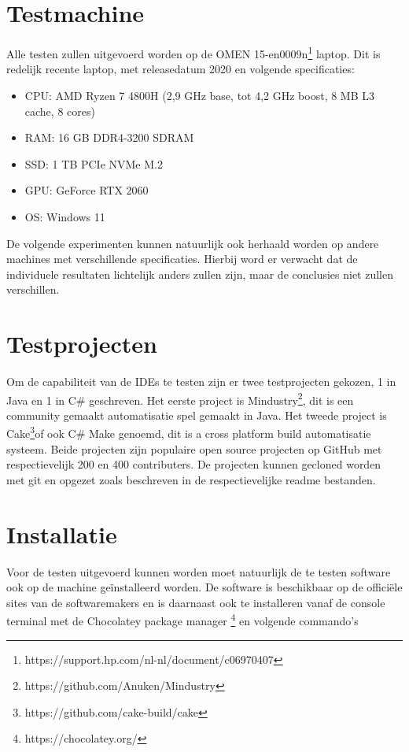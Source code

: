 \newpage

\section{Testmachine}
Alle testen zullen uitgevoerd worden op de OMEN 15-en0009n\footnote{https://support.hp.com/nl-nl/document/c06970407} laptop. Dit is redelijk recente laptop, met releasedatum 2020 en volgende specificaties:

\begin{itemize}
	\item 	CPU: AMD Ryzen 7 4800H (2,9 GHz base, tot 4,2 GHz boost, 8 MB L3 cache, 8 cores)
	\item RAM: 16 GB DDR4-3200 SDRAM
	\item SSD: 1 TB PCIe NVMe M.2
	\item GPU: GeForce RTX 2060
	\item OS: Windows 11
\end{itemize}

De volgende experimenten kunnen natuurlijk ook herhaald worden op andere machines met verschillende specificaties. Hierbij word er verwacht dat de individuele resultaten lichtelijk anders zullen zijn, maar de conclusies niet zullen verschillen.

\newcommand{\cakeRepoFN}{\footnote{https://github.com/cake-build/cake}}
\newcommand{\mindustryRepoFN}{\footnote{https://github.com/Anuken/Mindustry}}

\section{Testprojecten}
Om de capabiliteit van de IDEs te testen zijn er twee testprojecten gekozen, 1 in Java en 1 in C\# geschreven. Het eerste project is Mindustry\mindustryRepoFN, dit is een community gemaakt automatisatie spel gemaakt in Java. Het tweede project is Cake\cakeRepoFN of ook C\# Make genoemd, dit  is a cross platform build automatisatie systeem. Beide projecten zijn populaire open source projecten op GitHub met respectievelijk 200 en 400 contributers. De projecten kunnen gecloned worden met git en opgezet zoals beschreven in de respectievelijke readme bestanden.

\section{Installatie}
Voor de testen uitgevoerd kunnen worden moet natuurlijk de te testen software ook op de machine geïnstalleerd worden. De software is beschikbaar op de officiële sites van de softwaremakers en is daarnaast ook te installeren vanaf de console terminal met de Chocolatey package manager \footnote{https://chocolatey.org/} en volgende commando’s

